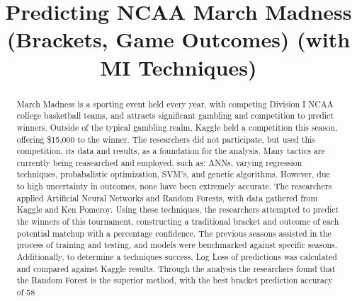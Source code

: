 \documentclass[conference]{IEEEtran}
\begin{document}
%
\title{Predicting NCAA March Madness (Brackets, Game Outcomes) (with MI Techniques)}


\author{
\and
{}
\and
{}
}


\maketitle


\begin{abstract}
March Madness is a sporting event held every year, with competing Division I NCAA college basketball teams, and attracts significant gambling and competition to predict winners.
Outside of the typical gambling realm, Kaggle held a competition this season, offering \$15,000 to the winner.
The researchers did not participate, but used this competition, its data and results, as a foundation for the analysis.
Many tactics are currently being reasearched and employed, such as: ANNs, varying regression techniques, probabalistic optimization, SVM's, and genetic algorithms.
However, due to high uncertainty in outcomes, none have been extremely accurate.
The researchers applied Artificial Neural Networks and Random Forests, with data gathered from Kaggle and Ken Pomeroy.
Using these techniques, the researchers attempted to predict the winners of this tournament, constructing a traditional bracket and outcome of each potential matchup with a percentage confidence.
The previous seasons assisted in the process of training and testing, and models were benchmarked against specific seasons.
Additionally, to determine a techniques success, Log Loss of predictions was calculated and compared against Kaggle results.
Through the analysis the researchers found that the Random Forest is the superior method, with the best bracket prediction accuracy of 58%
\end{abstract}
\end{document}
